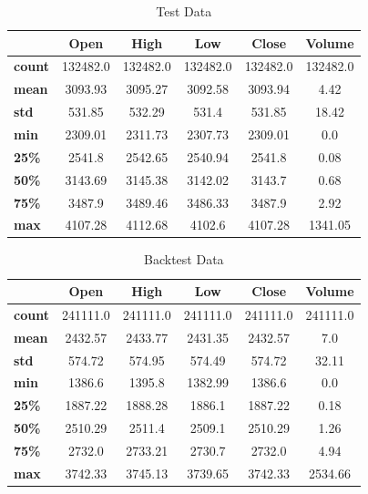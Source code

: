 \begin{table}[H]
    \centering
    \begin{tabular}{L{1.5cm}ccccc}
        \toprule
        & Open & High & Low & Close & Volume
        \\
        \midrule
        \textbf{count} & 132482.0 & 132482.0 & 132482.0 & 132482.0 & 132482.0 \\
        \textbf{mean}  & 3093.93  & 3095.27  & 3092.58  & 3093.94  & 4.42     \\
        \textbf{std}   & 531.85   & 532.29   & 531.4    & 531.85   & 18.42    \\
        \textbf{min}   & 2309.01  & 2311.73  & 2307.73  & 2309.01  & 0.0      \\
        \textbf{25\%}  & 2541.8   & 2542.65  & 2540.94  & 2541.8   & 0.08     \\
        \textbf{50\%}  & 3143.69  & 3145.38  & 3142.02  & 3143.7   & 0.68     \\
        \textbf{75\%}  & 3487.9   & 3489.46  & 3486.33  & 3487.9   & 2.92     \\
        \textbf{max}   & 4107.28  & 4112.68  & 4102.6   & 4107.28  & 1341.05  \\
        \bottomrule
    \end{tabular}
    \caption{Test Data}
    \label{tbl:test-data}
\end{table}

\begin{table}[H]
    \centering
    \begin{tabular}{L{1.5cm}ccccc}
        \toprule
        & Open & High & Low & Close & Volume
        \\
        \midrule
        \textbf{count} & 241111.0 & 241111.0 & 241111.0 & 241111.0 & 241111.0 \\
        \textbf{mean}  & 2432.57  & 2433.77  & 2431.35  & 2432.57  & 7.0      \\
        \textbf{std}   & 574.72   & 574.95   & 574.49   & 574.72   & 32.11    \\
        \textbf{min}   & 1386.6   & 1395.8   & 1382.99  & 1386.6   & 0.0      \\
        \textbf{25\%}  & 1887.22  & 1888.28  & 1886.1   & 1887.22  & 0.18     \\
        \textbf{50\%}  & 2510.29  & 2511.4   & 2509.1   & 2510.29  & 1.26     \\
        \textbf{75\%}  & 2732.0   & 2733.21  & 2730.7   & 2732.0   & 4.94     \\
        \textbf{max}   & 3742.33  & 3745.13  & 3739.65  & 3742.33  & 2534.66  \\
        \bottomrule
    \end{tabular}
    \caption{Backtest Data}
    \label{tbl:backtest-data}
\end{table}

